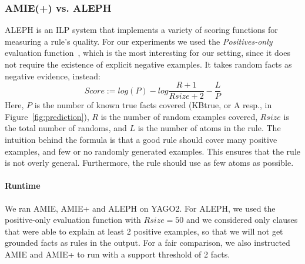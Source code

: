 \subsubsection{AMIE(+) vs. ALEPH}

ALEPH is an ILP system that implements a variety of scoring functions for measuring a rule's quality. For our experiments we used the
\emph{Positives-only} evaluation function~\cite{Muggleton:1996:LPD:647996.742465,usir1753},
which is the most interesting for our setting, since it does not require the existence of explicit negative examples.
It takes random facts as negative evidence, instead:
\[ Score := log(P)-log\frac{R+1}{Rsize+2}-\frac{L}{P} \]
Here, $P$ is the number of known true facts covered (KBtrue, or A resp., in Figure~\ref{fig:prediction}), $R$ is the number of random examples covered,
$Rsize$ is the total number of randoms, and $L$ is the number of atoms in the rule.
The intuition behind the formula is that a good rule should cover many positive examples, and few or no randomly generated examples. This ensures
that the rule is not overly general. Furthermore, the rule should use as few atoms as possible.%



\paragraph{Runtime}
We ran AMIE, AMIE+ and ALEPH on YAGO2. For ALEPH, we used the positive-only evaluation function with $Rsize=50$
and we considered only clauses that were able to explain at least 2 positive examples,
so that we will not get grounded facts as rules in the output.
For a fair comparison, we also instructed AMIE and AMIE+ to run with a support threshold of 2 facts.

